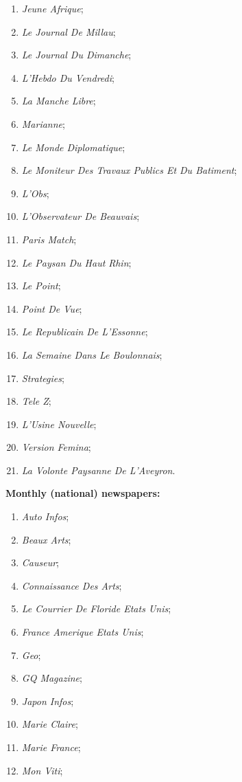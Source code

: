 \begin{multicols}{2}
\begin{enumerate}
	\item \textit{Jeune Afrique};
	\item \textit{Le Journal De Millau};
	\item \textit{Le Journal Du Dimanche};
	\item \textit{L'Hebdo Du Vendredi};
	\item \textit{La Manche Libre};
	\item \textit{Marianne};
	\item \textit{Le Monde Diplomatique};
	\item \textit{Le Moniteur Des Travaux Publics Et Du Batiment};
	\item \textit{L'Obs};
	\item \textit{L'Observateur De Beauvais};
	\item \textit{Paris Match};
	\item \textit{Le Paysan Du Haut Rhin};
	\item \textit{Le Point};
	\item \textit{Point De Vue};
	\item \textit{Le Republicain De L'Essonne};
	\item \textit{La Semaine Dans Le Boulonnais};
	\item \textit{Strategies};
	\item \textit{Tele Z};
	\item \textit{L'Usine Nouvelle};
	\item \textit{Version Femina};
	\item \textit{La Volonte Paysanne De L'Aveyron}.
	\end{enumerate}
\medskip	
\textbf{Monthly (national) newspapers:}
	\begin{enumerate}
	\item \textit{Auto Infos};
	\item \textit{Beaux Arts};
	\item \textit{Causeur};
	\item \textit{Connaissance Des Arts};
	\item \textit{Le Courrier De Floride Etats Unis};
	\item \textit{France Amerique Etats Unis};
	\item \textit{Geo};
	\item \textit{GQ Magazine};
	\item \textit{Japon Infos};
	\item \textit{Marie Claire};
	\item \textit{Marie France};
	\item \textit{Mon Viti};

\end{enumerate}
\end{multicols}
